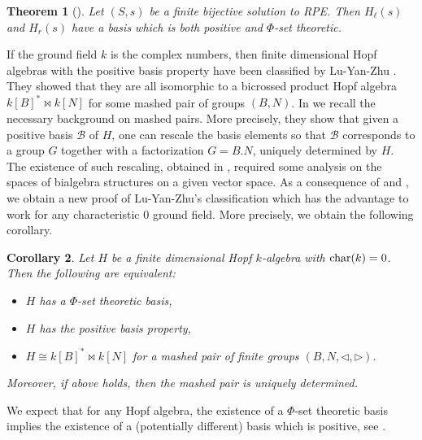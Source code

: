 \documentclass[a4paper,10pt]{amsart}
\newtheorem{maintheorem}{Theorem}
\newtheorem{maincorollary}[maintheorem]{Corollary}
\theoremstyle{definition}
\theoremstyle{remark}
\newcommand\triangler{\triangleright}
\newcommand\trianglel{\triangleleft}
\newcommand\Char{{\rm char}}
\newcommand\mc{\mathcal}
\begin{document}
\begin{maintheorem}[]\label{main thm positive basis}
Let $(S,s)$ be a finite bijective solution to RPE. Then $H_{\ell}(s)$ and $H_{r}(s)$ have a basis which is both positive and $\Phi$-set theoretic.
\end{maintheorem}

If the ground field $k$ is the complex numbers, then finite dimensional Hopf algebras with the positive basis property have been classified by Lu-Yan-Zhu \cite{zbMATH01616308}. They showed that they are all isomorphic to a bicrossed product Hopf algebra $k[B]^* \bowtie k[N]$ for some mashed pair of groups $(B,N)$. In  we recall the necessary background on mashed pairs. More precisely, they show that given a positive basis $\mc{B}$ of $H$, one can rescale the basis elements so that $\mc{B}$ corresponds to a group $G$ together with a factorization $G = B.N$, uniquely determined by $H$. The existence of such rescaling, obtained in \cite[Section 4]{zbMATH01616308}, required some analysis on the spaces of bialgebra structures on a given vector space. As a consequence of  and \cite{COvA}, we obtain a new proof of Lu-Yan-Zhu's classification which has the advantage to work for any characteristic $0$ ground field. More precisely, we obtain the following corollary.

\begin{maincorollary}\label{coro intro set basis iff positive}
    Let $H$ be a finite dimensional Hopf $k$-algebra with $\Char(k)=0$. Then the following are equivalent:
    \begin{itemize}
    \item $H$ has a $\Phi$-set theoretic basis,
    \item $H$ has the positive basis property,
    \item $H \cong k[B]^* \bowtie k[N]$ for a mashed pair of finite groups $(B,N, \trianglel,\triangler)$.
    \end{itemize}
    Moreover, if above holds, then the mashed pair is uniquely determined.
\end{maincorollary}

We expect that for any Hopf algebra, the existence of a $\Phi$-set theoretic basis implies the existence of a (potentially different) basis which is positive, see .
\end{document}
